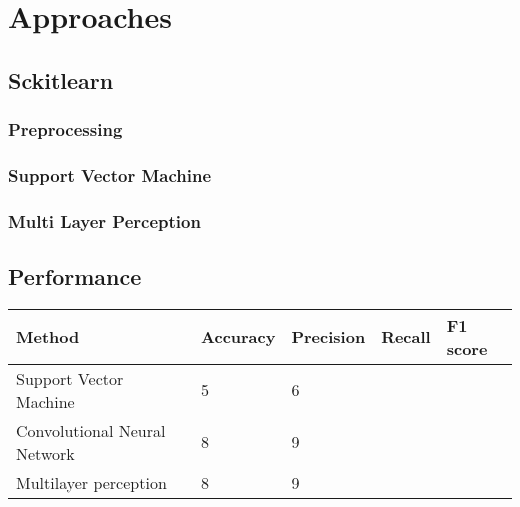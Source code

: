 \section{Approaches}

\subsection{Sckitlearn}

\subsubsection{Preprocessing}

\subsubsection{Support Vector Machine}

\subsubsection{Multi Layer Perception}

\subsection{Performance}
 
 
\begin{tabular}{ l | l l l l }
  Method & Accuracy & Precision & Recall & F1 score \\
  \hline
  Support Vector Machine & 5 & 6 \\
  Convolutional Neural Network & 8 & 9 \\
  Multilayer perception & 8 & 9 \\
\end{tabular}
